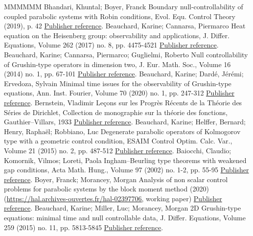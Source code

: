 \begin{thebibliography}{MMMMMM}
 Bhandari, Khuntal; Boyer, Franck Boundary null-controllability of coupled parabolic systems with Robin conditions, Evol. Equ. Control Theory (2019), p. 42 \href{https://ahl.centre-mersenne.org/item/AHL_2020__3__717_0/#BoyerBhandari:2019}{Publisher reference}.
 Beauchard, Karine; Cannarsa, Piermarco Heat equation on the Heisenberg group: observability and applications, J. Differ. Equations, Volume 262 (2017) no. 8, pp. 4475-4521 \href{https://ahl.centre-mersenne.org/item/AHL_2020__3__717_0/#BeauchardCannarsa17}{Publisher reference}.
 Beauchard, Karine; Cannarsa, Piermarco; Guglielmi, Roberto Null controllability of Grushin-type operators in dimension two, J. Eur. Math. Soc., Volume 16 (2014) no. 1, pp. 67-101 \href{https://ahl.centre-mersenne.org/item/AHL_2020__3__717_0/#BeauchardCannarsaGuglielmi}{Publisher reference}.
 Beauchard, Karine; Dardé, Jérémi; Ervedoza, Sylvain Minimal time issues for the observability of Grushin-type equations, Ann. Inst. Fourier, Volume 70 (2020) no. 1, pp. 247-312 \href{https://ahl.centre-mersenne.org/item/AHL_2020__3__717_0/#BeauchardDardeErvedoza}{Publisher reference}.
 Bernstein, Vladimir Leçons sur les Progrès Récents de la Théorie des Séries de Dirichlet, Collection de monographie sur la théorie des fonctions, Gauthier–Villars, 1933 \href{https://ahl.centre-mersenne.org/item/AHL_2020__3__717_0/#Bernstein33}{Publisher reference}.
 Beauchard, Karine; Helffer, Bernard; Henry, Raphaël; Robbiano, Luc Degenerate parabolic operators of Kolmogorov type with a geometric control condition, ESAIM Control Optim. Calc. Var., Volume 21 (2015) no. 2, pp. 487-512 \href{https://ahl.centre-mersenne.org/item/AHL_2020__3__717_0/#BHHR_Kolmogorov}{Publisher reference}.
 Baiocchi, Claudio; Komornik, Vilmos; Loreti, Paola Ingham–Beurling type theorems with weakened gap conditions, Acta Math. Hung., Volume 97 (2002) no. 1-2, pp. 55-95 \href{https://ahl.centre-mersenne.org/item/AHL_2020__3__717_0/#BaiocchiKomornikLoreti:2002}{Publisher reference}.
 Boyer, Franck; Morancey, Morgan Analysis of non scalar control problems for parabolic systems by the block moment method (2020) (\url{https://hal.archives-ouvertes.fr/hal-02397706,} working paper) \href{https://ahl.centre-mersenne.org/item/AHL_2020__3__717_0/#BoyerMorancey}{Publisher reference}.
 Beauchard, Karine; Miller, Luc; Morancey, Morgan 2D Grushin-type equations: minimal time and null controllable data, J. Differ. Equations, Volume 259 (2015) no. 11, pp. 5813-5845 \href{https://ahl.centre-mersenne.org/item/AHL_2020__3__717_0/#BeauchardMillerMorancey_Tmin}{Publisher reference}.

\end{thebibliography}
